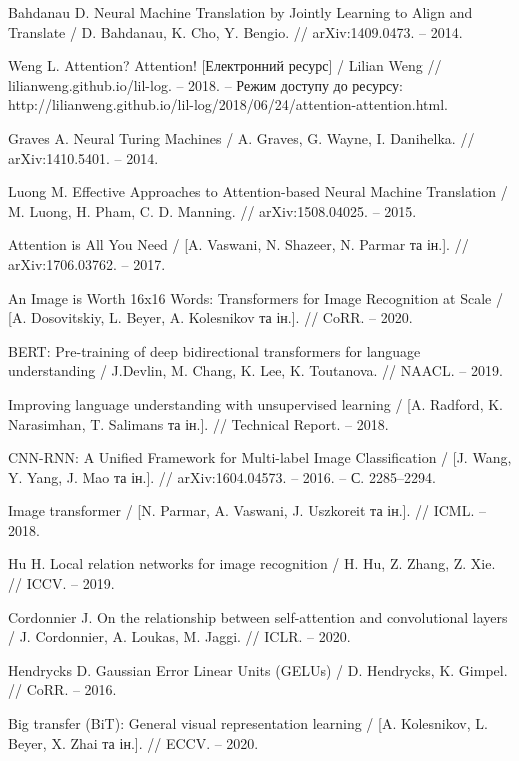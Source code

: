 \begin{thebibliography}{9}
    Bahdanau D. Neural Machine Translation by Jointly Learning to Align and Translate / D. Bahdanau, K. Cho, Y. Bengio. // arXiv:1409.0473. – 2014.

    Weng L. Attention? Attention! [Електронний ресурс] / Lilian Weng // lilianweng.github.io/lil-log. – 2018. – Режим доступу до ресурсу: http://lilianweng.github.io/lil-log/2018/06/24/attention-attention.html.

    Graves A. Neural Turing Machines / A. Graves, G. Wayne, I. Danihelka. // arXiv:1410.5401. – 2014.

    Luong M. Effective Approaches to Attention-based Neural Machine Translation / M. Luong, H. Pham, C. D. Manning. // arXiv:1508.04025. – 2015.

    Attention is All You Need / [A. Vaswani, N. Shazeer, N. Parmar та ін.]. // arXiv:1706.03762. – 2017.

    An Image is Worth 16x16 Words: Transformers for Image Recognition at Scale / [A. Dosovitskiy, L. Beyer, A. Kolesnikov та ін.]. // CoRR. – 2020.

    BERT: Pre-training of deep bidirectional transformers for language understanding / J.Devlin, M. Chang, K. Lee, K. Toutanova. // NAACL. – 2019.

    Improving language understanding with unsupervised learning / [A. Radford, K. Narasimhan, T. Salimans та ін.]. // Technical Report. – 2018.

    CNN-RNN: A Unified Framework for Multi-label Image Classification / [J. Wang, Y. Yang, J. Mao та ін.]. // arXiv:1604.04573. – 2016. – С. 2285–2294.

    Image transformer / [N. Parmar, A. Vaswani, J. Uszkoreit та ін.]. // ICML. – 2018.

    Hu H. Local relation networks for image recognition / H. Hu, Z. Zhang, Z. Xie. // ICCV. – 2019.

    Cordonnier J. On the relationship between self-attention and convolutional layers / J. Cordonnier, A. Loukas, M. Jaggi. // ICLR. – 2020.

    Hendrycks D. Gaussian Error Linear Units (GELUs) / D. Hendrycks, K. Gimpel. // CoRR. – 2016.

    Big transfer (BiT): General visual representation learning / [A. Kolesnikov, L. Beyer, X. Zhai та ін.]. // ECCV. – 2020.

\end{thebibliography}